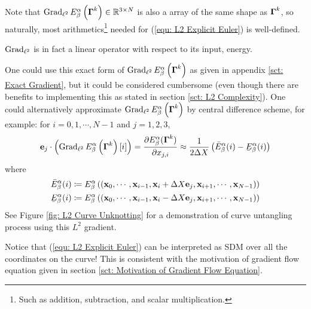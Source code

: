 \documentclass[../dissertation.tex]{subfiles}
\begin{document}
Note that $\operatorname{Grad}_{\ell^2} E_{\beta}^\alpha \left( \boldsymbol{\Gamma}^k \right) \in \mathbb{R}^{3 \times N}$ is also a array of the same shape as $\boldsymbol{\Gamma}^k$,
so naturally, most arithmetics\footnote{Such as addition, subtraction, and scalar multiplication.} needed for (\ref{equ: L2 Explicit Euler}) is well-defined.
\begin{remark}
    $\operatorname{Grad}_{\ell^2}$ is in fact a linear operator with respect to its input, energy.
\end{remark}

One could use this exact form of $\operatorname{Grad}_{\ell^2} E_{\beta}^{\alpha} \left( \boldsymbol{\Gamma}^k \right)$ as given in appendix \ref{sct: Exact Gradient}, but it could be considered cumbersome (even though there are benefits to implementing this as stated in section \ref{sct: L2 Complexity}).
One could alternatively approximate $\operatorname{Grad}_{\ell^2} E_{\beta}^{\alpha} \left( \boldsymbol{\Gamma}^k \right)$ by central difference scheme, for example:
for $i=0,1,\cdots,N-1$ and $j = 1,2,3$,
\begin{equation}
    \ebf_j \cdot \left( \Grad_{\ell^2} E_{\beta}^{\alpha} \left( \Gammabf^k \right) [i] \right)
    =
    \frac{\partial E_{\beta}^{\alpha} (\Gammabf^k)}{\partial x_{j,i}}
    \approx
    \frac{1}{2 \Delta X} \left( 
        \bar{E}_{\beta}^{\alpha} (i)
        -
        \underaccent{\bar} E_{\beta}^{\alpha} (i)
    \right)
\end{equation}
where
\begin{align*}
    \bar{E}_{\beta}^{\alpha} (i) &\coloneqq E_{\beta}^{\alpha} \left( \left( \xbf_0, \cdots, \xbf_{i-1}, \xbf_i + \Delta X \ebf_{j}, \xbf_{i+1}, \cdots, \xbf_{N-1}\right) \right) \\
    \underaccent{\bar}{E}_{\beta}^{\alpha} (i) &\coloneqq E_{\beta}^{\alpha} \left( \left( \xbf_0, \cdots, \xbf_{i-1}, \xbf_i - \Delta X \ebf_{j}, \xbf_{i+1}, \cdots, \xbf_{N-1}\right) \right)
\end{align*}
See Figure \ref{fig: L2 Curve Unknotting} for a demonstration of curve untangling process using this $L^2$ gradient.

\begin{remark}
Notice that (\ref{equ: L2 Explicit Euler}) can be interpreted as SDM over all the coordinates on the curve!
This is consistent with the motivation of gradient flow equation given in section \ref{sct: Motivation of Gradient Flow Equation}.
\end{remark}
\end{document}

